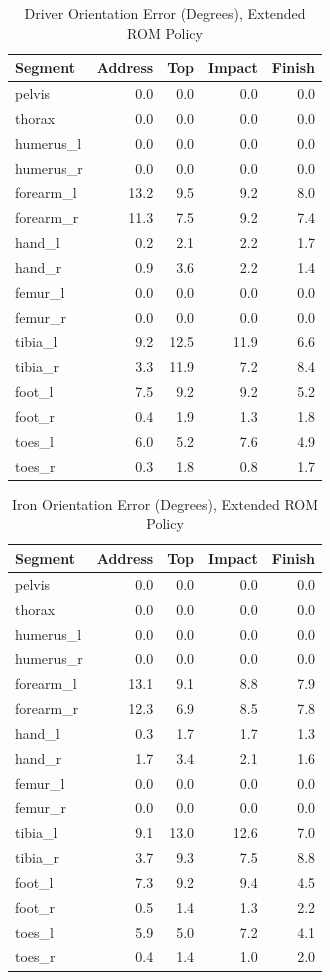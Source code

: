 \documentclass[11pt,a4paper]{article}
\begin{document}
\begin{table}[h]\centering\small
\caption{Driver Orientation Error (Degrees), Extended ROM Policy}
\begin{tabular}{lrrrr}\toprule Segment & Address & Top & Impact & Finish \\\midrule
pelvis & 0.0 & 0.0 & 0.0 & 0.0 \\
thorax & 0.0 & 0.0 & 0.0 & 0.0 \\
humerus\_l & 0.0 & 0.0 & 0.0 & 0.0 \\
humerus\_r & 0.0 & 0.0 & 0.0 & 0.0 \\
forearm\_l & 13.2 & 9.5 & 9.2 & 8.0 \\
forearm\_r & 11.3 & 7.5 & 9.2 & 7.4 \\
hand\_l & 0.2 & 2.1 & 2.2 & 1.7 \\
hand\_r & 0.9 & 3.6 & 2.2 & 1.4 \\
femur\_l & 0.0 & 0.0 & 0.0 & 0.0 \\
femur\_r & 0.0 & 0.0 & 0.0 & 0.0 \\
tibia\_l & 9.2 & 12.5 & 11.9 & 6.6 \\
tibia\_r & 3.3 & 11.9 & 7.2 & 8.4 \\
foot\_l & 7.5 & 9.2 & 9.2 & 5.2 \\
foot\_r & 0.4 & 1.9 & 1.3 & 1.8 \\
toes\_l & 6.0 & 5.2 & 7.6 & 4.9 \\
toes\_r & 0.3 & 1.8 & 0.8 & 1.7 \\
\bottomrule\end{tabular}\end{table}

\begin{table}[h]\centering\small
\caption{Iron Orientation Error (Degrees), Extended ROM Policy}
\begin{tabular}{lrrrr}\toprule Segment & Address & Top & Impact & Finish \\\midrule
pelvis & 0.0 & 0.0 & 0.0 & 0.0 \\
thorax & 0.0 & 0.0 & 0.0 & 0.0 \\
humerus\_l & 0.0 & 0.0 & 0.0 & 0.0 \\
humerus\_r & 0.0 & 0.0 & 0.0 & 0.0 \\
forearm\_l & 13.1 & 9.1 & 8.8 & 7.9 \\
forearm\_r & 12.3 & 6.9 & 8.5 & 7.8 \\
hand\_l & 0.3 & 1.7 & 1.7 & 1.3 \\
hand\_r & 1.7 & 3.4 & 2.1 & 1.6 \\
femur\_l & 0.0 & 0.0 & 0.0 & 0.0 \\
femur\_r & 0.0 & 0.0 & 0.0 & 0.0 \\
tibia\_l & 9.1 & 13.0 & 12.6 & 7.0 \\
tibia\_r & 3.7 & 9.3 & 7.5 & 8.8 \\
foot\_l & 7.3 & 9.2 & 9.4 & 4.5 \\
foot\_r & 0.5 & 1.4 & 1.3 & 2.2 \\
toes\_l & 5.9 & 5.0 & 7.2 & 4.1 \\
toes\_r & 0.4 & 1.4 & 1.0 & 2.0 \\
\bottomrule\end{tabular}\end{table}
\end{document}
